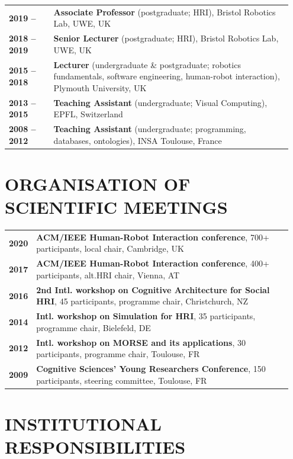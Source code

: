 \documentclass[11pt,a4paper]{report}
\begin{document}
\begin{tabular}{p{0.15\linewidth}p{0.8\linewidth}}
    \bf 2019 --  & \textbf{Associate Professor} (postgraduate; HRI), Bristol Robotics Lab, UWE, UK \\
    \bf 2018 -- 2019 & \textbf{Senior Lecturer} (postgraduate; HRI), Bristol Robotics Lab, UWE, UK \\
    \bf 2015 -- 2018 & \textbf{Lecturer} (undergraduate \& postgraduate; robotics
    fundamentals, software engineering, human-robot interaction), Plymouth University, UK \\
    \bf 2013 -- 2015 & \textbf{Teaching Assistant} (undergraduate; Visual Computing), EPFL, Switzerland \\
    \bf 2008 -- 2012 & \textbf{Teaching Assistant} (undergraduate; programming, databases, ontologies), INSA Toulouse, France \\
\end{tabular}

\section{ORGANISATION OF SCIENTIFIC MEETINGS}

\begin{tabular}{p{0.05\linewidth}p{0.9\linewidth}}
    \bf 2020 & \textbf{ACM/IEEE Human-Robot Interaction conference}, 700+ participants, local chair, Cambridge, UK \\
    \bf 2017 & \textbf{ACM/IEEE Human-Robot Interaction conference}, 400+
    participants, alt.HRI chair, Vienna, AT \\
    \bf 2016 & \textbf{2nd Intl. workshop on Cognitive Architecture for Social HRI}, 45 participants, programme chair, Christchurch, NZ \\
    \bf 2014 & \textbf{Intl. workshop on Simulation for HRI}, 35 participants, programme chair, Bielefeld, DE \\
    \bf 2012 & \textbf{Intl. workshop on MORSE and its applications}, 30 participants, programme chair, Toulouse, FR \\
    \bf 2009 & \textbf{Cognitive Sciences’ Young Researchers Conference}, 150 participants, steering committee, Toulouse, FR \\
\end{tabular}

\section{INSTITUTIONAL RESPONSIBILITIES}
\end{document}
